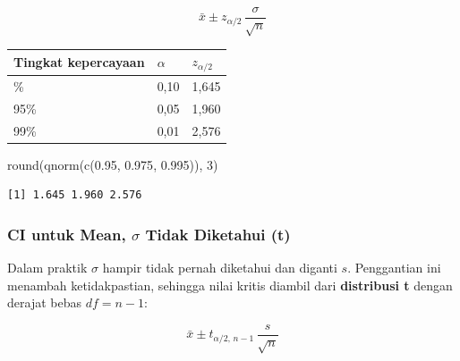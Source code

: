 \documentclass[
  indonesian,
  letterpaper,
]{book}
\newenvironment{Shaded}{\begin{snugshade}}{\end{snugshade}}
\newcommand{\DecValTok}[1]{\textcolor[rgb]{0.68,0.00,0.00}{#1}}
\newcommand{\FloatTok}[1]{\textcolor[rgb]{0.68,0.00,0.00}{#1}}
\newcommand{\FunctionTok}[1]{\textcolor[rgb]{0.28,0.35,0.67}{#1}}
\newcommand{\NormalTok}[1]{\textcolor[rgb]{0.00,0.23,0.31}{#1}}
\newcounter{none} %
\begin{document}
\[\bar{x} \pm z_{\alpha/2}\,\frac{\sigma}{\sqrt{n}}\]

{\def\LTcaptype{none} %
\begin{longtable}[]{@{}lll@{}}
\toprule\noalign{}
Tingkat kepercayaan & \(\alpha\) & \(z_{\alpha/2}\) \\
\midrule\noalign{}
\endhead
\bottomrule\noalign{}
\endlastfoot
90\% & 0,10 & 1,645 \\
95\% & 0,05 & 1,960 \\
99\% & 0,01 & 2,576 \\
\end{longtable}
}

\begin{Shaded}
\begin{Highlighting}[]
\FunctionTok{round}\NormalTok{(}\FunctionTok{qnorm}\NormalTok{(}\FunctionTok{c}\NormalTok{(}\FloatTok{0.95}\NormalTok{, }\FloatTok{0.975}\NormalTok{, }\FloatTok{0.995}\NormalTok{)), }\DecValTok{3}\NormalTok{)}
\end{Highlighting}
\end{Shaded}

\begin{verbatim}
[1] 1.645 1.960 2.576
\end{verbatim}

\subsubsection{\texorpdfstring{\textbf{CI untuk Mean, \(\sigma\) Tidak
Diketahui
(t)}}{CI untuk Mean, \textbackslash sigma Tidak Diketahui (t)}}\label{ci-untuk-mean-sigma-tidak-diketahui-t}

Dalam praktik \(\sigma\) hampir tidak pernah diketahui dan diganti
\(s\). Penggantian ini menambah ketidakpastian, sehingga nilai kritis
diambil dari \textbf{distribusi t} dengan derajat bebas \(df = n - 1\):

\[\bar{x} \pm t_{\alpha/2,\,n-1}\,\frac{s}{\sqrt{n}}\]
\end{document}
